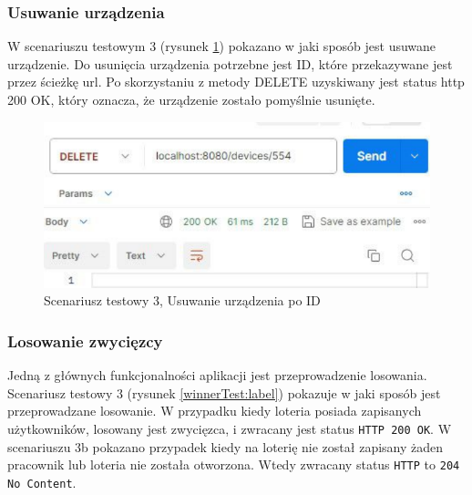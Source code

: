 \subsubsection{Usuwanie urządzenia}
W scenariuszu testowym 3 (rysunek \ref{deleteTest:label}) pokazano w jaki sposób jest usuwane urządzenie. Do usunięcia urządzenia potrzebne jest ID, które przekazywane jest przez ścieżkę url. Po skorzystaniu z metody DELETE uzyskiwany jest status http 200 OK, który oznacza, że urządzenie zostało pomyślnie usunięte.


\begin{figure}[h]
		\centering
    \includegraphics[width=0.48\linewidth]{rys06/postmanTest/delete.pdf}
    \caption{Scenariusz testowy 3, Usuwanie urządzenia po ID}
    \label{deleteTest:label}
\end{figure}


\subsubsection{Losowanie zwycięzcy}

Jedną z głównych funkcjonalności aplikacji jest przeprowadzenie losowania. Scenariusz testowy 3 (rysunek \ref{winnerTest:label}) pokazuje w jaki sposób jest przeprowadzane losowanie. W przypadku kiedy loteria posiada zapisanych użytkowników, losowany jest zwycięzca, i zwracany jest status \mbox{\texttt{HTTP 200 OK}}. W scenariuszu 3b pokazano przypadek kiedy na loterię nie został zapisany żaden pracownik lub loteria nie została otworzona. Wtedy  zwracany status \texttt{HTTP} to \texttt{204 No Content}. 


